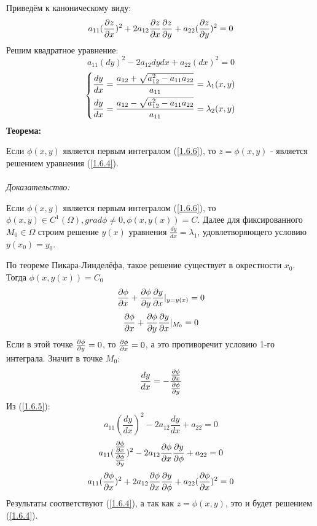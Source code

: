 \documentclass[../main.tex]{subfiles}
\begin{document}
	Приведём к каноническому виду:
	\begin{equation}\label{1.6.4}
		a_{11}(\frac{\partial z}{\partial x})^2+2a_{12}\frac{\partial z}{\partial x}\frac{\partial z}{\partial y}+a_{22}(\frac{\partial z}{\partial y})^2=0
	\end{equation}
	Решим квадратное уравнение:
	\begin{equation}\label{1.6.5}
		a_{11}(dy)^2-2a_{12}dydx+a_{22}(dx)^2=0
	\end{equation}
	\begin{equation}\label{1.6.6}
		\begin{dcases}
			\frac{dy}{dx} = \frac{a_{12}+\sqrt{a_{12}^2-a_{11}a_{22}}}{a_{11}}=\lambda_1(x,y) \\
			\frac{dy}{dx} = \frac{a_{12}-\sqrt{a_{12}^2-a_{11}a_{22}}}{a_{11}}=\lambda_2(x,y)
		\end{dcases}
	\end{equation}
	\textbf{Теорема:}\\
	\par Если $\phi(x,y)$ является первым интегралом (\ref{1.6.6}), то $z=\phi(x,y)$ - является решением уравнения (\ref{1.6.4}). \\ \\
	\textit{Доказательство:}\\
	\par Если $\phi(x,y)$ является первым интегралом (\ref{1.6.6}), то $\phi(x,y) \in C^1(\Omega), grad\phi \ne 0, \phi(x,y(x))=C$. Далее для фиксированного $M_0\in\Omega$ строим решение $y(x)$ уравнения $\frac{dy}{dx}=\lambda_1$, удовлетворяющего условию $y(x_0)=y_0$.\\
	\par По теореме Пикара-Линделёфа, такое решение существует в окрестности $x_0$. Тогда $\phi(x,y(x))=C_0$
	$$\frac{\partial \phi}{\partial x}+\frac{\partial \phi}{\partial y}\frac{\partial y}{\partial x}|_{y=y(x)}=0$$
	$$\frac{\partial \phi}{\partial x}+\frac{\partial \phi}{\partial y}\frac{\partial y}{\partial x}|_{M_0}=0$$
	Если в этой точке $\frac{\partial \phi}{\partial y}=0$, то $\frac{\partial \phi}{\partial x}=0$, а это противоречит условию 1-го интеграла. Значит в точке $M_0$:
	$$\frac{dy}{dx}=-\frac{\frac{\partial \phi}{\partial x}}{\frac{\partial \phi}{\partial y}}$$
	Из (\ref{1.6.5}):
	$$ a_{11}(\frac{dy}{dx})^2-2a_{12}\frac{dy}{dx}+a_{22}=0$$
	$$ a_{11}(\frac{\frac{\partial \phi}{\partial x}}{\frac{\partial \phi}{\partial y}})^2-2a_{12}\frac{\partial \phi}{\partial x}\frac{\partial y}{\partial \phi}+a_{22}=0$$
	$$ a_{11}(\frac{\partial \phi}{\partial x})^2+2a_{12}\frac{\partial \phi}{\partial x}\frac{\partial y}{\partial \phi}+a_{22}(\frac{\partial \phi}{\partial x})^2=0$$
	Результаты соответствуют (\ref{1.6.4}), а так как $z = \phi(x,y)$, это и будет решением (\ref{1.6.4}).
\end{document}
